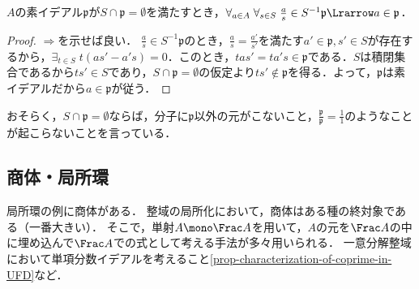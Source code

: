 \documentclass[uplatex,dvipdfmx]{jsreport}
\renewcommand{\p}{\mathfrak{p}}
\begin{document}
\begin{lemma}
    $A$の素イデアル$\p$が$S\cap\p=\emptyset$を満たすとき，$\forall_{a\in A}\;\forall_{s\in S}\;\frac{a}{s}\in S^{-1}\p\Lrarrow a\in\p$．
\end{lemma}
\begin{proof}
    $\Rightarrow$を示せば良い．
    $\frac{a}{s}\in S^{-1}\p$のとき，$\frac{a}{s}=\frac{a'}{s'}$を満たす$a'\in\p,s'\in S$が存在するから，$\exists_{t\in S}\;t(as'-a's)=0$．このとき，$tas'=ta's\in\p$である．$S$は積閉集合であるから$ts'\in S$であり，$S\cap\p=\emptyset$の仮定より$ts'\notin\p$を得る．よって，$\p$は素イデアルだから$a\in\p$が従う．
\end{proof}
\begin{remarks}
    おそらく，$S\cap\p=\emptyset$ならば，分子に$\p$以外の元がこないこと，$\frac{\p}{\p}=\frac{1}{1}$のようなことが起こらないことを言っている．
\end{remarks}

\subsection{商体・局所環}

\begin{tcolorbox}[colframe=ForestGreen, colback=ForestGreen!10!white,breakable,colbacktitle=ForestGreen!40!white,coltitle=black,fonttitle=\bfseries\sffamily,
title=]
    局所環の例に商体がある．
    整域の局所化において，商体はある種の終対象である（一番大きい）．
    そこで，単射$A\mono\Frac A$を用いて，$A$の元を$\Frac A$の中に埋め込んで$\Frac A$での式として考える手法が多々用いられる．
    一意分解整域において単項分数イデアルを考えること\ref{prop-characterization-of-coprime-in-UFD}など．
\end{tcolorbox}
\end{document}
